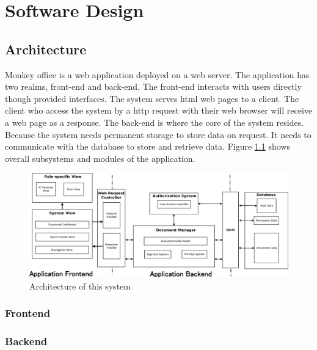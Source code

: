 \chapter{Software Design}



\section{Architecture}
Monkey office is a web application deployed on a web server.
The application has two realms, front-end and back-end.
The front-end interacts with users directly though provided interfaces.
The system serves \gls{html} web pages to a client.
The client who access the system by a \gls{http} request with their web browser will receive a web page as a response.
The back-end is where the core of the system resides.
Because the system needs permanent storage to store data on request.
It needs to communicate with the database to store and retrieve data.
Figure \ref{fig:architecutre} shows overall subsystems and modules of the application.

\begin{landscape}
	\begin{figure}
		\centering
		\caption{Architecture of this system}
		\label{fig:architecutre}
		\includegraphics[scale=0.37]{res/software-design/monkeyOffice_architecture}
	\end{figure}
\end{landscape}

\subsection{Frontend}

\subsection{Backend}

